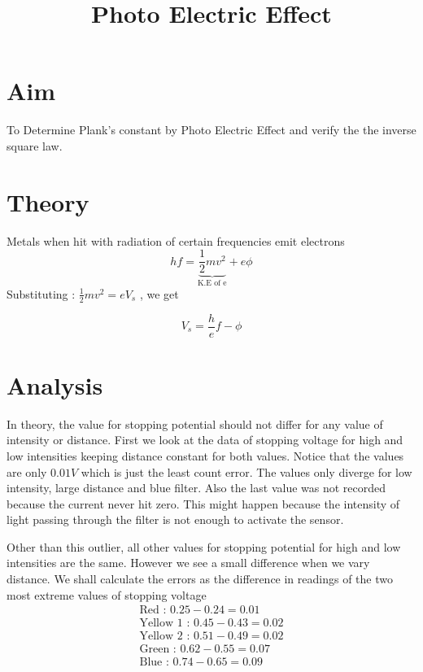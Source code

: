 \documentclass[12pt]{article}
\begin{document}
\author{}
\date{}
\title{Photo Electric Effect}
\maketitle
\captionsetup[figure]{labelformat=empty}
\captionsetup{justification = centering}

\section*{Aim}
To Determine Plank's constant by Photo Electric Effect and verify the the inverse square law.

\section*{Theory}
Metals when hit with radiation of certain frequencies emit electrons
\[hf = \underbrace{\frac{1}{2}mv^2}_\text{K.E of e}+e\phi \]
Substituting : $\displaystyle \frac{1}{2}mv^2= eV_s$ , we get

\[V_s=\frac{h}{e}f - \phi\]

\section*{Analysis}
In theory, the value for stopping potential should not differ for any value of intensity or distance.
First we look at the data of stopping voltage for high and low intensities keeping distance constant for both values.
Notice that the values are only $0.01V$ which is just the least count error.
The values only diverge for low intensity, large distance and blue filter.
Also the last value was not recorded because the current never hit zero.
This might happen because the intensity of light passing through the filter is not enough to activate the sensor.

Other than this outlier, all other values for stopping potential for high and low intensities are the same.
However we see a small difference when we vary distance.
We shall calculate the errors as the difference in readings of the two most extreme values of stopping voltage
\begin{align*}
    \text{Red : }0.25-0.24 = 0.01 \\
    \text{Yellow 1 : }0.45-0.43 = 0.02 \\
    \text{Yellow 2 : }0.51-0.49 = 0.02 \\
    \text{Green : }0.62-0.55 = 0.07 \\ 
    \text{Blue : }0.74-0.65 = 0.09 \\
\end{align*}
\end{document}
